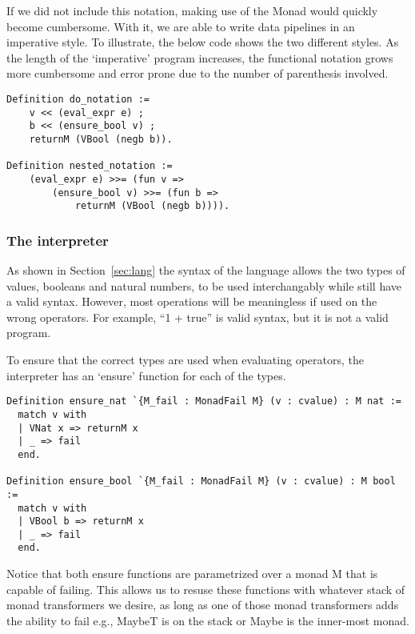 If we did not include this notation, making use of the Monad would quickly
become cumbersome. With it, we are able to write data pipelines in an
imperative style. To illustrate, the below code shows the two
different styles. As the length of the `imperative' program increases, the
functional notation grows more cumbersome and error prone due to the number of
parenthesis involved.

\begin{listing}
\begin{verbatim}
Definition do_notation :=
	v << (eval_expr e) ;
	b << (ensure_bool v) ;
	returnM (VBool (negb b)).

Definition nested_notation :=
	(eval_expr e) >>= (fun v =>
		(ensure_bool v) >>= (fun b =>
			returnM (VBool (negb b)))).
\end{verbatim}
\end{listing}

\subsubsection{The interpreter}
As shown in Section~\ref{sec:lang} the syntax of the language allows the two
types of values, booleans and natural numbers, to be used interchangably while
still have a valid syntax. However, most operations will be meaningless if used
on the wrong operators. For example, ``1 + true'' is valid syntax, but it is 
not a valid program.

To ensure that the correct types are used when evaluating operators,
the interpreter has an `ensure' function for each of the types. 

\begin{listing}
\begin{verbatim}
Definition ensure_nat `{M_fail : MonadFail M} (v : cvalue) : M nat :=
  match v with
  | VNat x => returnM x
  | _ => fail
  end.
            
Definition ensure_bool `{M_fail : MonadFail M} (v : cvalue) : M bool :=
  match v with
  | VBool b => returnM x
  | _ => fail
  end.
\end{verbatim}
\end{listing}

Notice that both ensure functions are parametrized over a monad M that is
capable of failing. This allows us to resuse these functions with whatever
stack of monad transformers we desire, as long as one of those monad
transformers adds the ability to fail e.g., MaybeT is on the stack or Maybe is
the inner-most monad.

